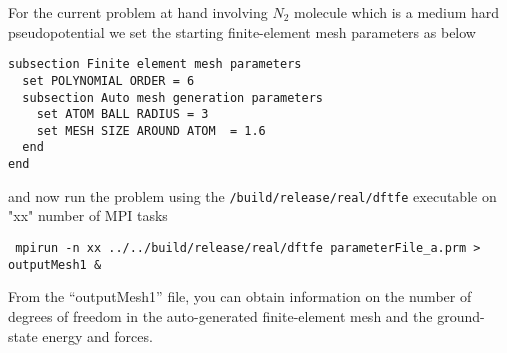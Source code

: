 \begin{enumerate}
For the current problem at hand involving $N_2$ molecule which is a medium hard pseudopotential we set the starting finite-element mesh parameters as below 




\begin{verbatim}	
subsection Finite element mesh parameters
  set POLYNOMIAL ORDER = 6
  subsection Auto mesh generation parameters
    set ATOM BALL RADIUS = 3
    set MESH SIZE AROUND ATOM  = 1.6
  end
end
\end{verbatim} 
and now run the problem using the \verb|/build/release/real/dftfe| executable on "xx" number of MPI tasks
\begin{verbatim}
 mpirun -n xx ../../build/release/real/dftfe parameterFile_a.prm > outputMesh1 &
\end{verbatim}
From the ``outputMesh1'' file, you can obtain information on the number of degrees of freedom in the auto-generated finite-element mesh and the ground-state energy and forces. 


\end{enumerate}
